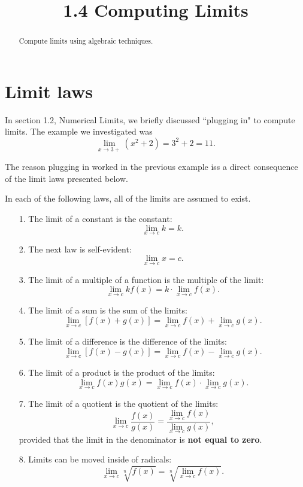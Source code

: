 \documentclass{ximera}
\title{1.4 Computing Limits}
\begin{document}
\begin{abstract}
Compute limits using algebraic techniques.
\end{abstract}

\maketitle


\section{Limit laws}
 
In section 1.2, Numerical Limits, we briefly discussed ``plugging in" to compute limits.
 The example we investigated was
 \[
 \lim_{x \to 3+} \left(x^2 + 2 \right) = 3^2 + 2 = 11.
 \]

The reason plugging in worked in the previous example iss a direct consequence of the limit laws presented below.
 
In each of the following laws, all of the limits are assumed to exist.

\begin{enumerate}

\item[1.]  
The limit of a constant is the constant:
 \[
 \lim_{x \to c} k = k.
 \]
 
\item[2.]
 The next law is self-evident:
 \[
 \lim_{x \to c} x = c.
 \]
 
 \item[3.]
 The limit of a multiple of a function is the multiple of the limit:
 \[
 \lim_{x \to c} kf(x) = k \cdot \lim_{x \to c} f(x). 
 \]
 
 \item[4.]
 The limit of a sum is the sum of the limits:
 \[
 \lim_{x \to c} \left[f(x) + g(x) \right] = \lim_{x \to c} f(x) + \lim_{x \to c} g(x). 
 \]
 
\item[5.]
 The limit of a difference is the difference of the limits:
 \[
 \lim_{x \to c} \left[f(x) - g(x) \right] = \lim_{x \to c} f(x) - \lim_{x \to c} g(x). 
 \]
 
\item[6.]
 The limit of a product is the product of the limits:
 \[
 \lim_{x \to c} f(x) g(x) = \lim_{x \to c} f(x) \cdot \lim_{x \to c} g(x). 
 \]


\item[7.]
 The limit of a quotient is the quotient of the limits:
 \[
 \lim_{x \to c} \frac{f(x)}{g(x)} = \frac{\lim_{x \to c} f(x)}{\lim_{x \to c} g(x)}, 
 \]
 provided that the limit in the denominator is \textbf{not equal to zero}.
 
 \item[8.]
 Limits can be moved inside of radicals:
 \[
 \lim_{x \to c} \sqrt[n]{f(x)} = \sqrt[n]{\lim_{x \to c} f(x)}. 
 \]

\end{enumerate}
\end{document}
